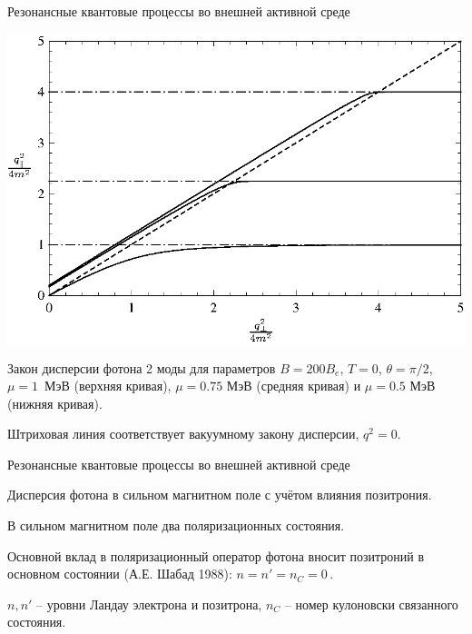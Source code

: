 \documentclass{beamer}
\begin{document}
\begin{frame}{Резонансные квантовые процессы во внешней активной среде}
\begin{center}
\includegraphics[scale=0.7]{fig2_3.eps}

Закон дисперсии фотона 2 моды для параметров $B=200B_e$, $T = 0$, $\theta=\pi/2$, $\mu = 1$~МэВ (верхняя кривая),
$\mu = 0.75$ МэВ (средняя кривая) и  $\mu = 0.5$ МэВ (нижняя кривая).

Штриховая линия соответствует вакуумному закону дисперсии, $q^2 = 0$.
\end{center}
\end{frame}
\begin{frame}{Резонансные квантовые процессы во внешней активной среде}
\begin{center}
\alert{Дисперсия фотона в сильном магнитном поле с учётом влияния позитрония.}

\vspace*{2mm}

В сильном магнитном поле два поляризационных состояния.

Основной вклад в поляризационный оператор фотона вносит позитроний в основном состоянии (А.Е. Шабад 1988): $n=n'=n_C=0\, .$

$n, n'$ -- уровни Ландау электрона и позитрона, $n_C$ -- номер кулоновски связанного состояния.
\end{center}
\end{frame}
\end{document}
